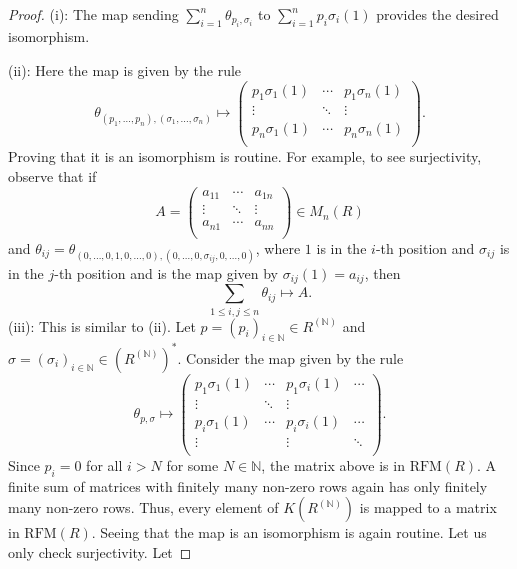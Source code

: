 \documentclass[11pt]{amsart}
\numberwithin{equation}{section}
\theoremstyle{definition}
\theoremstyle{plain}
\theoremstyle{definition}
\begin{document}
\begin{proof}
(i): The map sending $\sum_{i = 1}^n \theta_{p_i, \sigma_i}$ to $\sum_{i=1}^n p_i\sigma_i(1)$ provides the desired isomorphism. 

(ii): Here the map is given by the rule 
\begin{equation*}
\theta_{(p_1, \dots, p_n), (\sigma_1, \dots, \sigma_n)} \mapsto \begin{pmatrix}
    p_1\sigma_1(1) & \cdots & p_1\sigma_n(1) \\
    \vdots & \ddots & \vdots \\
    p_n\sigma_1(1) & \cdots & p_n\sigma_n(1) \\
\end{pmatrix}.
\end{equation*}
Proving that it is an isomorphism is routine. For example, to see surjectivity, observe that if 
\begin{equation*}
A = \begin{pmatrix}
    a_{11} & \cdots & a_{1n} \\
    \vdots & \ddots & \vdots \\
    a_{n1} & \cdots & a_{nn} \\
\end{pmatrix} \in M_n(R)
\end{equation*}
and $\theta_{ij} = \theta_{(0, \dots, 0, 1, 0, \dots, 0), (0, \dots, 0, \sigma_{ij}, 0, \dots, 0)}$, where $1$ is in the $i$-th position and $\sigma_{ij}$ is in the $j$-th position and is the map given by $\sigma_{ij}(1) = a_{ij}$, then  
\begin{equation*}
\sum_{1 \leq i, j \leq n} \theta_{ij} \mapsto A.
\end{equation*}
(iii): This is similar to (ii). Let $p = (p_i)_{i \in \mathbb{N}} \in R^{(\mathbb{N})}$ and $\sigma = (\sigma_i)_{i \in \mathbb{N}} \in (R^{(\mathbb{N})})^*$. Consider the map given by the rule 
\begin{equation*}
\theta_{p, \sigma} \mapsto \begin{pmatrix}
    p_1\sigma_1(1) & \cdots & p_1\sigma_i(1) & \cdots \\
    \vdots & \ddots & \vdots & \\
    p_i\sigma_1(1) & \cdots & p_i\sigma_i(1) & \cdots \\
    \vdots & & \vdots & \ddots \\
\end{pmatrix}.
\end{equation*}
Since $p_i = 0$ for all $i > N$ for some $N \in \mathbb{N}$, the matrix above is in $\mathrm{RFM}(R)$. A finite sum of matrices with finitely many non-zero rows again has only finitely many non-zero rows. Thus, every element of $K(R^{(\mathbb{N})})$ is mapped to a matrix in $\mathrm{RFM}(R)$. Seeing that the map is an isomorphism is again routine. Let us only check surjectivity. Let 

\end{proof}
\end{document}

